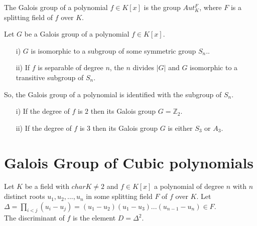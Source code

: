 \begin{definition}
  The Galois group of a polynomial \(f \in K[x]\) is the group \(Aut_K^F\), where \(F\) is a splitting field of \(f\) over \(K\).
  \end{definition}

  \begin{theorem}
  Let \(G\) be a Galois group of a polynomial \(f \in K[x]\).
\begin{enumerate}
\item[i)] \(G\) is isomorphic to a subgroup of some symmetric group \(S_n\)..
  \item[ii)] If \(f\) is separable of degree \(n\), the \(n\) divides \(|G|\) and \(G\) isomorphic to a transitive subgroup of \(S_n\).
  \end{enumerate}
\end{theorem}
So, the Galois group of a polynomial is identified with the subgroup of \(S_n\).\\

\begin{corollary}
\begin{enumerate}
\item[i)] If the degree of \(f\) is \(2\) then its Galois group \(G={\mathbb{Z}}_2\).
  \item[ii)] If the degree of \(f\) is \(3\) then its Galois group \(G\) is either \(S_3\) or \(A_3\).
  \end{enumerate}
\end{corollary}


\section{Galois Group of Cubic polynomials}
\begin{definition}
  Let \(K\) be a field with \(char K \neq 2\) and \(f \in K[x]\) a polynomial of degree \(n\) with \(n\) distinct roots \(u_1,u_2,...,u_n\) in some splitting field \(F\) of \(f\) over \(K\). Let \(\Delta = \prod\limits_{i<j}(u_i-u_j) = (u_1-u_2)(u_1-u_3)...(u_{n-1}-u_n) \in F\).\\
  The discriminant of \(f\) is the element \(D= {\Delta}^2\).
\end{definition}

